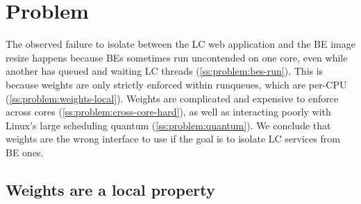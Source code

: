 \section{Problem}\label{s:problem}

The observed failure to isolate between the LC web application and the BE image
resize happens because BEs sometimes run uncontended on one core, even while
another has queued and waiting LC threads (\autoref{ss:problem:bes-run}). This
is because weights are only strictly enforced within runqueues, which are
per-CPU (\autoref{ss:problem:weights-local}). Weights are complicated and
expensive to enforce across cores (\autoref{ss:problem:cross-core-hard}), as
well as interacting poorly with Linux's large scheduling quantum
(\autoref{ss:problem:quantum}). We conclude that weights are the wrong interface
to use if the goal is to isolate LC services from BE ones.

\subsection{Weights are a local property}\label{ss:problem:bes-run}


